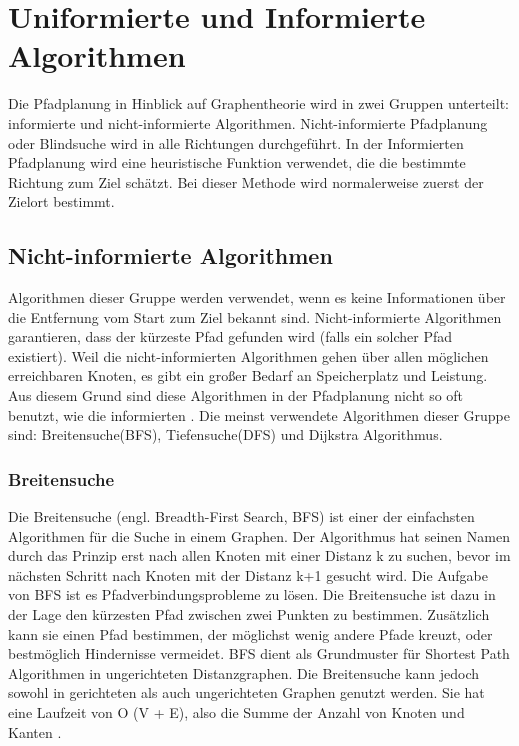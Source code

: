 \chapter{Uniformierte und Informierte Algorithmen}

Die Pfadplanung in Hinblick auf Graphentheorie wird in zwei Gruppen unterteilt: informierte und nicht-informierte Algorithmen. Nicht-informierte Pfadplanung oder Blindsuche wird in alle Richtungen durchgeführt. In der Informierten Pfadplanung wird eine heuristische Funktion verwendet, die die bestimmte Richtung zum Ziel schätzt. Bei dieser Methode wird normalerweise zuerst der Zielort bestimmt\cite{comAnal}.

\section{Nicht-informierte Algorithmen}
Algorithmen dieser Gruppe werden verwendet, wenn es keine Informationen über die Entfernung vom Start zum Ziel bekannt sind. Nicht-informierte Algorithmen garantieren, dass der kürzeste Pfad gefunden wird (falls ein solcher Pfad existiert)\cite{comAnal}. Weil die nicht-informierten Algorithmen gehen über allen möglichen erreichbaren Knoten, es gibt ein großer Bedarf an Speicherplatz und Leistung. Aus diesem Grund sind diese Algorithmen in der Pfadplanung nicht so oft benutzt, wie die informierten\cite{sim} \cite{comAnal}. Die meinst verwendete Algorithmen dieser Gruppe sind: Breitensuche(BFS), Tiefensuche(DFS) und Dijkstra Algorithmus.

\subsection{Breitensuche}

Die Breitensuche (engl. Breadth-First Search, BFS) ist einer der einfachsten Algorithmen für die Suche in einem Graphen. Der Algorithmus hat seinen Namen durch das Prinzip erst nach allen Knoten mit einer Distanz k zu suchen, bevor im nächsten Schritt nach Knoten mit der Distanz k+1 gesucht wird\cite{Cormen.2009}. Die Aufgabe von BFS ist es Pfadverbindungsprobleme zu lösen. Die Breitensuche ist dazu in der Lage den kürzesten Pfad zwischen zwei Punkten zu bestimmen. Zusätzlich kann sie einen Pfad bestimmen, der möglichst wenig andere Pfade kreuzt, oder bestmöglich Hindernisse vermeidet\cite{Lee.1961}. BFS dient als Grundmuster für Shortest Path Algorithmen in ungerichteten Distanzgraphen\cite{Ottmann.2017}. Die Breitensuche kann jedoch sowohl in gerichteten als auch ungerichteten Graphen genutzt werden. Sie hat eine Laufzeit von O (V + E), also die Summe der Anzahl von Knoten und Kanten \cite{Cormen.2009}. \newline

